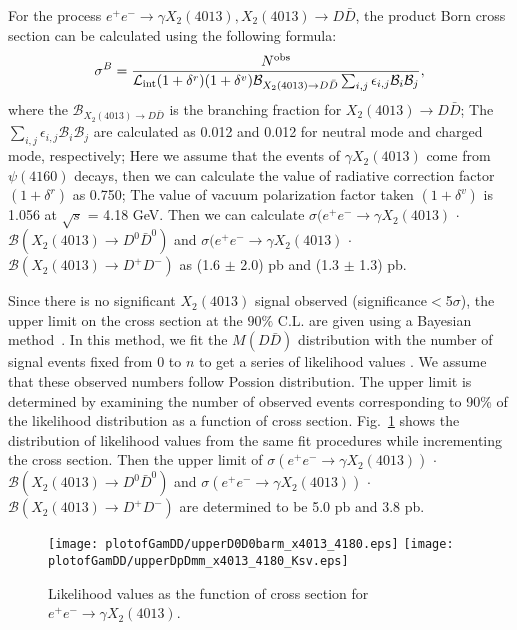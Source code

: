 \documentclass[aps,preprint,tightenlines,superscriptaddress,showpacs,byrevtex,amsmath,amssymb,nofloatfix]{revtex4}
\begin{document}
For the process $e^{+}e^{-} \rightarrow \gamma X_{2}(4013), X_{2}(4013) \to D\bar{D}$, the product Born cross section can be calculated using the following formula:
\begin{equation}
  \sigma^{B} = \frac{N^{\rm obs}}{\mathcal{L}_{\rm int} (1+\delta^{r}) (1+\delta^{v}) \mathcal{B}_{X_{2}(4013)\rightarrow D\bar{D}} \sum_{i,j}\epsilon_{i,j} \mathcal{B}_{i}\mathcal{B}_{j}},
\end{equation}
where the $\mathcal{B}_{X_{2}(4013)\rightarrow D\bar{D}}$ is the branching fraction for $X_{2}(4013) \rightarrow D\bar{D}$; The $\sum_{i,j}\epsilon_{i,j} \mathcal{B}_{i}\mathcal{B}_{j}$ are calculated as 0.012 and 0.012 for neutral mode and charged mode, respectively;  Here we assume that the events of $\gamma X_{2}(4013)$  come from $\psi(4160)$ decays, then we can calculate the value of radiative correction factor $(1+\delta^{r})$ as 0.750; The value of vacuum polarization factor taken $(1+\delta^{v})$ is 1.056 at $\sqrt{s}$ = 4.18 GeV. Then we can calculate $\sigma (e^{+}e^{-}\rightarrow \gamma X_{2}(4013)$ $\cdot$ $\mathcal{B}(X_{2}(4013)\rightarrow  D^{0}\bar{D}^{0})$ and $\sigma (e^{+}e^{-}\rightarrow \gamma X_{2}(4013)$ $\cdot$ $\mathcal{B}(X_{2}(4013)\rightarrow  D^{+}D^{-})$ as (1.6 $\pm$ 2.0) pb and (1.3 $\pm$ 1.3) pb.

Since there is no significant $X_{2}(4013)$ signal observed (significance$<$5$\sigma$), the upper limit on the cross section at the $90\%$ C.L. are given using a Bayesian method~\cite{upperlimit}. In this method, we fit the $M(D\bar{D})$ distribution with the number of signal events fixed from 0 to $n$ to get a series of likelihood values . We assume that these observed numbers follow Possion distribution.  The upper limit is determined by examining the  number of observed events  corresponding to 90\% of the likelihood distribution as a function of cross section. Fig.~\ref{FitDDbar_4013_up} shows the distribution of likelihood values from the same fit procedures while incrementing the cross section. Then the upper limit of $\sigma (e^{+}e^{-}\rightarrow \gamma X_{2}(4013))$ $\cdot$ $\mathcal{B}(X_{2}(4013)\rightarrow  D^{0}\bar{D}^{0})$ and  $\sigma (e^{+}e^{-}\rightarrow \gamma X_{2}(4013))$ $\cdot$ $\mathcal{B}(X_{2}(4013)\rightarrow  D^{+}D^{-})$ are determined to be 5.0 pb and 3.8 pb.

\begin{figure}[!htbp]
\captionsetup{justification=raggedright}
    \texttt{[image: plotofGamDD/upperD0D0barm\_x4013\_4180.eps]}
    \texttt{[image: plotofGamDD/upperDpDmm\_x4013\_4180\_Ksv.eps]}

  \caption{\small Likelihood values as the function of cross section for $e^{+}e^{-} \rightarrow \gamma X_{2}(4013)$.}
  \label{FitDDbar_4013_up}
\end{figure}
\end{document}
